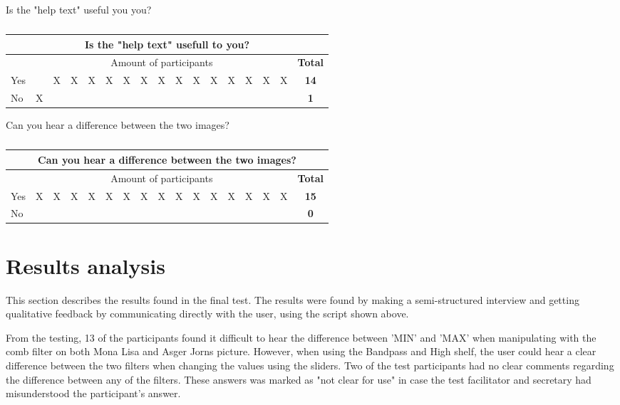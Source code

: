 Is the "help text" useful you you?
\begin{table}[!h]
\centering
\caption{}
\label{tab:helptext}
\begin{tabular}{|l|c|c|c|c|c|c|c|c|c|c|c|c|c|c|c|c|}
\hline
\multicolumn{17}{|c|}{Is the "help text" usefull to you?} \\ \hline
 & \multicolumn{15}{c|}{Amount of participants} & \textbf{Total} \\ \hline
Yes &  & X & X & X & X & X & X & X & X & X & X & X & X & X & X & \textbf{14} \\ \hline
No & X &  &  &  &  &  &  &  &  &  &  &  &  &  &  & \textbf{1} \\ \hline
\end{tabular}
\end{table}

Can you hear a difference between the two images?
\begin{table}[!h]
\centering
\caption{}
\label{tab:twoimagedifference}
\begin{tabular}{|l|c|c|c|c|c|c|c|c|c|c|c|c|c|c|c|c|}
\hline
\multicolumn{17}{|c|}{Can you hear a difference between the two images?} \\ \hline
 & \multicolumn{15}{c|}{Amount of participants} & \textbf{Total} \\ \hline
Yes & X & X & X & X & X & X & X & X & X & X & X & X & X & X & X & \textbf{15} \\ \hline
No &  &  &  &  &  &  &  &  &  &  &  &  &  &  &  & \textbf{0} \\ \hline
\end{tabular}
\end{table}


\section{Results analysis}
This section describes the results found in the final test. The results were found by making a semi-structured interview and getting qualitative feedback by communicating directly with the user, using the script shown above. 

From the testing, 13 of the participants found it difficult to hear the difference between 'MIN' and 'MAX' when manipulating with the comb filter on both Mona Lisa and Asger Jorns picture. However, when using the Bandpass and High shelf, the user could hear a clear difference between the two filters when changing the values using the sliders. Two of the test participants had no clear comments regarding the difference between any of the filters. These answers was marked as "not clear for use" in case the test facilitator and secretary had misunderstood the participant's answer. 

